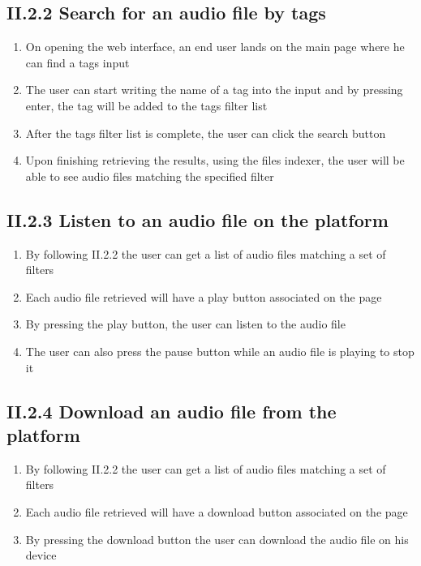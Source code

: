 \documentclass[11pt, a4papper]{report}
\theoremstyle{plain}
\theoremstyle{definition}
\theoremstyle{definition}
\theoremstyle{proposition}
\begin{document}
\subsection*{II.2.2 Search for an audio file by tags}

\begin{enumerate}
	\item{On opening the web interface, an end user lands on the main page where he can find a tags input}
	\item{The user can start writing the name of a tag into the input and by pressing enter, the tag will be added to the tags filter list}
	\item{After the tags filter list is complete, the user can click the search button}
	\item{Upon finishing retrieving the results, using the files indexer, the user will be able to see audio files matching the specified filter}
\end{enumerate}

	
\subsection*{II.2.3 Listen to an audio file on the platform}

\begin{enumerate}
	\item{By following II.2.2 the user can get a list of audio files matching a set of filters}
	\item{Each audio file retrieved will have a play button associated on the page}
	\item{By pressing the play button, the user can listen to the audio file}
	\item{The user can also press the pause button while an audio file is playing to stop it}
\end{enumerate}

\subsection*{II.2.4 Download an audio file from the platform}

\begin{enumerate}
	\item{By following II.2.2 the user can get a list of audio files matching a set of filters}
	\item{Each audio file retrieved will have a download button associated on the page}
	\item{By pressing the download button the user can download the audio file on his device}
\end{enumerate}
\end{document}
